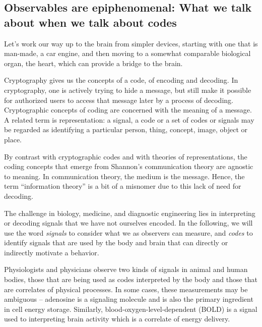 \documentclass[12pt]{article}
\begin{document}
\subsection*{Observables are epiphenomenal: What we talk about when we talk about codes}

Let's work our way up to the brain from simpler devices, starting with one that is man-made, a car engine, and then moving to a somewhat comparable biological organ, the
heart, which can provide a bridge to the brain.

Cryptography gives us the concepts of a code, of encoding and decoding. In cryptography, one is actively trying to hide a message, but still make it possible for authorized
users to access that message later by a process of decoding. Cryptographic concepts of coding are concerned with the meaning of a message. A related term 
is representation: a signal, a code or a set of codes or signals may be regarded as identifying a particular person, thing, concept, image, object or place.

By contrast with cryptographic codes and with theories of representations, the coding concepts that emerge from Shannon’s communication
theory are agnostic to meaning.\cite{Shannon1948-ks} In communication theory, the medium is the message.
Hence, the term ``information theory'' is a bit of a misnomer due to this lack of need for decoding.


The challenge in biology, medicine, and diagnostic engineering lies in interpreting or decoding signals that we have not ourselves encoded. 
In the following, we will use the word {\em signals} to consider what we as observers can measure, and {\em codes} to identify signals that
are used by the body and brain that can directly or indirectly motivate a behavior.

Physiologists and physicians observe two kinds of signals in animal and human bodies, those that are being used as codes interpreted by the body and those that are correlates of physical
processes. In some cases, these measurements may be ambiguous -- adenosine is a signaling molecule and is also the primary ingredient in cell energy storage.
Similarly, blood-oxygen-level-dependent (BOLD) is a signal used to interpreting brain activity which is a correlate of energy delivery.
\end{document}
